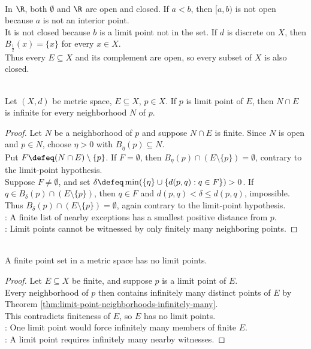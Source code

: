 \begin{example} \label{ex:open-closed-neither-and-both} \\
In $\R$, both $\emptyset$ and $\R$ are open and closed. If $a<b$, then $[a,b)$ is not open because $a$ is not an interior point.\\
It is not closed because $b$ is a limit point not in the set. If $d$ is discrete on $X$, then $B_{\frac12}(x)=\{x\}$ for every $x\in X$.\\
Thus every $E\subseteq X$ and its complement are open, so every subset of $X$ is also closed.
\end{example}

\begin{theorem} \label{thm:limit-point-neighborhoods-infinitely-many} \\
Let $(X,d)$ be metric space, $E\subseteq X$, $p\in X$. If $p$ is limit point of $E$, then $N\cap E$ is infinite for every neighborhood $N$ of $p$.
\begin{proof}
Let $N$ be a neighborhood of $p$ and suppose $N\cap E$ is finite. Since $N$ is open and $p\in N$, choose $\eta>0$ with $B_\eta(p)\subseteq N$.\\
Put $F\defeq(N\cap E)\setminus\{p\}$. If $F=\emptyset$, then $B_\eta(p)\cap(E\setminus\{p\})=\emptyset$, contrary to the limit-point hypothesis.\\
Suppose $F\neq\emptyset$, and set $\delta\defeq\min(\{\eta\}\cup\{d(p,q):q\in F\})>0$. If $q\in B_\delta(p)\cap(E\setminus\{p\})$, then $q\in F$ and $d(p,q)<\delta\leq d(p,q)$, impossible.\\
Thus $B_\delta(p)\cap(E\setminus\{p\})=\emptyset$, again contrary to the limit-point hypothesis.\\
: A finite list of nearby exceptions has a smallest positive distance from $p$.\\
: Limit points cannot be witnessed by only finitely many neighboring points.
\end{proof}
\end{theorem}

\begin{corollary} \label{cor:finite-point-set-no-limit-points} \\
A finite point set in a metric space has no limit points.
\begin{proof}
Let $E\subseteq X$ be finite, and suppose $p$ is a limit point of $E$.\\
Every neighborhood of $p$ then contains infinitely many distinct points of $E$ by Theorem \ref{thm:limit-point-neighborhoods-infinitely-many}.\\
This contradicts finiteness of $E$, so $E$ has no limit points.\\
: One limit point would force infinitely many members of finite $E$.\\
: A limit point requires infinitely many nearby witnesses.
\end{proof}
\end{corollary}

